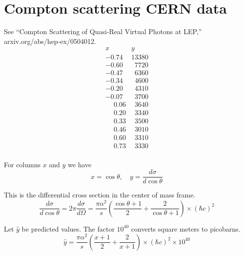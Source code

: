 

\section*{Compton scattering CERN data}

See ``Compton Scattering of Quasi-Real Virtual Photons at LEP,''
arxiv.org/abs/hep-ex/0504012.
\begin{equation*}
\begin{matrix}
x & y\\
-0.74 & 13380\\
-0.60 & \phantom{0}7720\\
-0.47 & \phantom{0}6360\\
-0.34 & \phantom{0}4600\\
-0.20 & \phantom{0}4310\\
-0.07 & \phantom{0}3700\\
\phantom{+}0.06 & \phantom{0}3640\\
\phantom{+}0.20 & \phantom{0}3340\\
\phantom{+}0.33 & \phantom{0}3500\\
\phantom{+}0.46 & \phantom{0}3010\\
\phantom{+}0.60 & \phantom{0}3310\\
\phantom{+}0.73 & \phantom{0}3330\\
\end{matrix}
\end{equation*}

For columns $x$ and $y$ we have
\begin{equation*}
x=\cos\theta,
\quad
y=\frac{d\sigma}{d\cos\theta}
\end{equation*}

This is the differential cross section in the center of mass frame.
\begin{equation*}
\frac{d\sigma}{d\cos\theta}
=2\pi\frac{d\sigma}{d\Omega}
=\frac{\pi\alpha^2}{s}\left(
\frac{\cos\theta+1}{2}+\frac{2}{\cos\theta+1}
\right)\times(\hbar c)^2
\end{equation*}

Let $\hat y$ be predicted values.
The factor $10^{40}$ converts square meters to picobarns.
\begin{equation*}
\hat y
=
\frac{\pi\alpha^2}{s}
\left(
\frac{x+1}{2}+
\frac{2}{x+1}
\right)
\times(\hbar c)^2
\times10^{40}
\end{equation*}


